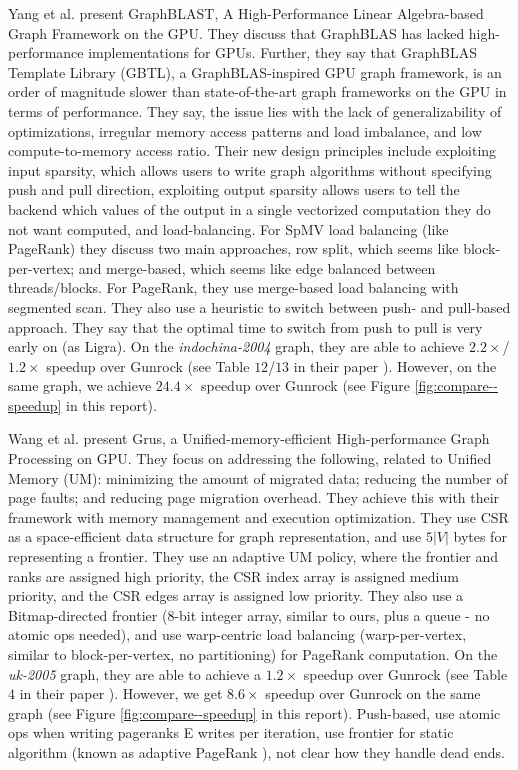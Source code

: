 Yang et al. \cite{yang2022graphblast} present GraphBLAST, A High-Performance Linear Algebra-based Graph Framework on the GPU. They discuss that GraphBLAS has lacked high-performance implementations for GPUs. Further, they say that GraphBLAS Template Library (GBTL), a GraphBLAS-inspired GPU graph framework, is an order of magnitude slower than state-of-the-art graph frameworks on the GPU in terms of performance. They say, the issue lies with the lack of generalizability of optimizations, irregular memory access patterns and load imbalance, and low compute-to-memory access ratio. Their new design principles include exploiting input sparsity, which allows users to write graph algorithms without specifying push and pull direction, exploiting output sparsity allows users to tell the backend which values of the output in a single vectorized computation they do not want computed, and load-balancing. For SpMV load balancing (like PageRank) they discuss two main approaches, row split, which seems like block-per-vertex; and merge-based, which seems like edge balanced between threads/blocks. For PageRank, they use merge-based load balancing with segmented scan. They also use a heuristic to switch between push- and pull-based approach. They say that the optimal time to switch from push to pull is very early on (as Ligra). On the \textit{indochina-2004} graph, they are able to achieve $2.2\times$/$1.2\times$ speedup over Gunrock (see Table $12$/$13$ in their paper \cite{yang2022graphblast}). However, on the same graph, we achieve $24.4\times$ speedup over Gunrock (see Figure \ref{fig:compare--speedup} in this report).


Wang et al. \cite{wang2021grus} present Grus, a Unified-memory-efficient High-performance Graph Processing on GPU. They focus on addressing the following, related to Unified Memory (UM): minimizing the amount of migrated data; reducing the number of page faults; and reducing page migration overhead. They achieve this with their framework with memory management and execution optimization. They use CSR as a space-efficient data structure for graph representation, and use $5|V|$ bytes for representing a frontier. They use an adaptive UM policy, where the frontier and ranks are assigned high priority, the CSR index array is assigned medium priority, and the CSR edges array is assigned low priority. They also use a Bitmap-directed frontier (8-bit integer array, similar to ours, plus a queue - no atomic ops needed), and use warp-centric load balancing (warp-per-vertex, similar to block-per-vertex, no partitioning) for PageRank computation. On the \textit{uk-2005} graph, they are able to achieve a $1.2\times$ speedup over Gunrock (see Table $4$ in their paper \cite{wang2021grus}). However, we get $8.6\times$ speedup over Gunrock on the same graph (see Figure \ref{fig:compare--speedup} in this report).
Push-based, use atomic ops when writing pageranks E writes per iteration, use frontier for static algorithm (known as adaptive PageRank \cite{kamvar2004adaptive}), not clear how they handle dead ends.

